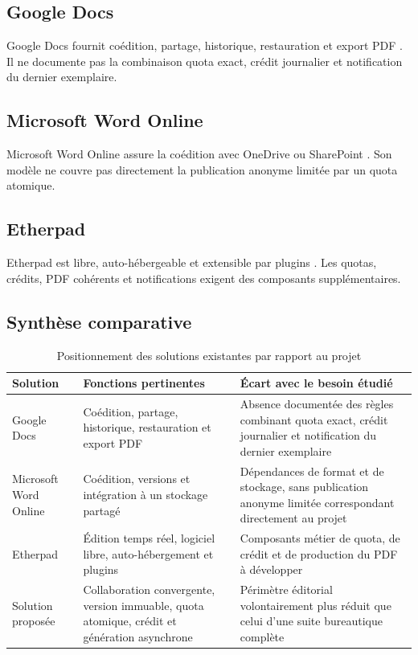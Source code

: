 \subsection{Google Docs}

Google Docs fournit coédition, partage, historique, restauration et export PDF \cite{googledocs}. Il ne documente pas la combinaison quota exact, crédit journalier et notification du dernier exemplaire.

\subsection{Microsoft Word Online}

Microsoft Word Online assure la coédition avec OneDrive ou SharePoint \cite{wordonline}. Son modèle ne couvre pas directement la publication anonyme limitée par un quota atomique.

\subsection{Etherpad}

Etherpad est libre, auto-hébergeable et extensible par plugins \cite{etherpad}. Les quotas, crédits, PDF cohérents et notifications exigent des composants supplémentaires.

\subsection{Synthèse comparative}

\begin{table}[H]
  \centering
  \caption{Positionnement des solutions existantes par rapport au projet}
  \label{tab:solutions-existantes}
  \small
  \begin{tabular}{|P{2.7cm}|P{4.6cm}|P{5.8cm}|}
    \hline
    \textbf{Solution} & \textbf{Fonctions pertinentes} & \textbf{Écart avec le besoin étudié} \\
    \hline
    Google Docs & Coédition, partage, historique, restauration et export PDF & Absence documentée des règles combinant quota exact, crédit journalier et notification du dernier exemplaire \\
    \hline
    Microsoft Word Online & Coédition, versions et intégration à un stockage partagé & Dépendances de format et de stockage, sans publication anonyme limitée correspondant directement au projet \\
    \hline
    Etherpad & Édition temps réel, logiciel libre, auto-hébergement et plugins & Composants métier de quota, de crédit et de production du PDF à développer \\
    \hline
    Solution proposée & Collaboration convergente, version immuable, quota atomique, crédit et génération asynchrone & Périmètre éditorial volontairement plus réduit que celui d'une suite bureautique complète \\
    \hline
  \end{tabular}
\end{table}

